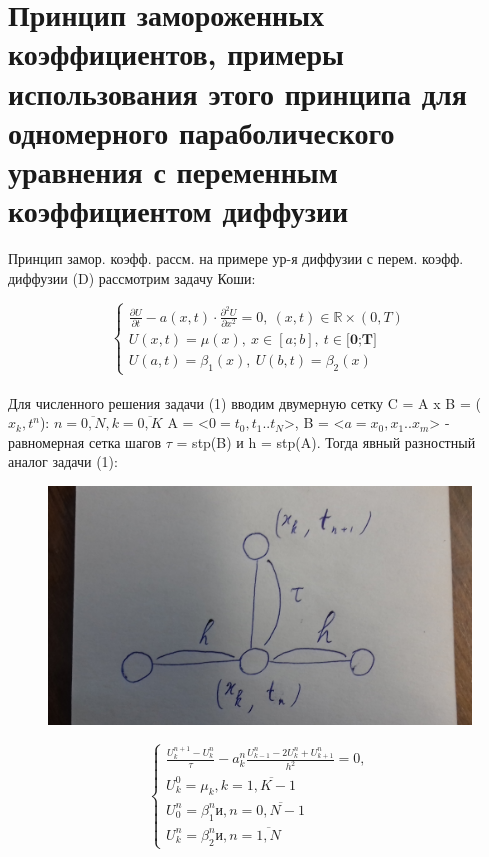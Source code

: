 \documentclass[__main__.tex]{subfiles}
\begin{document}
\section{Принцип замороженных коэффициентов, примеры использования этого принципа для одномерного параболического уравнения с переменным коэффициентом диффузии}

Принцип замор. коэфф. рассм. на примере ур-я диффузии с перем. коэфф. диффузии (D) рассмотрим задачу Коши:

\begin{equation} \label{42.1}
\begin{cases}
\frac{\partial U}{\partial t} - a(x,t) \cdot \frac{\partial^2 U}{\partial x^2} = 0, \ \left(x,t\right) \in \mathbb{R} \times \left(0,T\right) \\
U(x,t) = \mu(x), \ x\in [a;b], \ t \in \textbf{[0;T]} \\
U(a,t) = \beta_1(x), \ U(b,t) = \beta_2(x)
\end{cases}
\end{equation}

\paragraph{}
Для численного решения задачи (1) вводим двумерную сетку C = A x B = ($x_k, t^n$): $n = \overline{0,N}, k = \overline{0,K}$  A = <$0 = t_0, t_1 .. t_N $>, B = <$a = x_0, x_1 .. x_m $> - равномерная сетка шагов $\tau$ = stp(B) и h = stp(A). Тогда явный разностный аналог задачи (1):

\begin{figure}[ht]
	\centering
	\includegraphics[width=0.4\linewidth]{img/img_42_1}
	\caption{}
	\label{img_42.1}
\end{figure}

\begin{equation} \label{42.2}
\begin{cases}
\frac{U^{n+1}_k - U^{n}_k}{\tau} - a^n_k \frac{U^{n}_{k-1} - 2U^{n}_k + U^n_{k+1}}{h^2} = 0, \\
U^0_k = \mu_k, k = \overline{1,K-1} \\
U^n_0 = \beta_1^n \textbf{и}, n = \overline{0,N-1} \\
U^n_k = \beta_2^n \textbf{и}, n = \overline{1,N} 
\end{cases}
\end{equation} 
\end{document}
